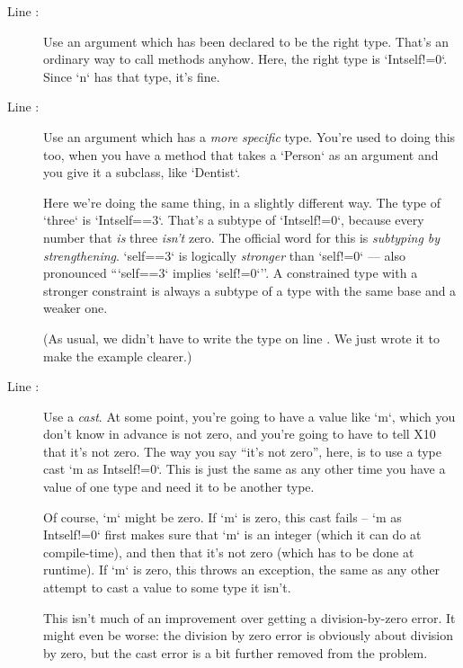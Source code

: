 \begin{description}
\item [Line :] Use an argument which has been
      declared to be the right type.  That's an ordinary way to call methods
      anyhow.  Here, the right type is \xcd`Int{self!=0}`.  Since \xcd`n` has
      that type, it's fine.
\item [Line :] Use an argument which has a
      {\em more specific} type.  You're used to doing this too, when you have
      a method that takes a \xcd`Person` as an argument and you give it a
      subclass, like \xcd`Dentist`.  

      Here we're doing the same thing, in a
      slightly different way. 
      The type of \xcd`three` is \xcd`Int{self==3}`.  That's a subtype of 
      \xcd`Int{self!=0}`, because every number that {\em is} three {\em isn't}
      zero.    The official word for this is {\em subtyping by strengthening}.  
      \xcd`self==3` is logically {\em stronger} than \xcd`self!=0` --- also
      pronounced ``\xcd`self==3` implies \xcd`self!=0`''.  
      A constrained type with a stronger constraint is always a subtype of a
      type with the same base and a weaker one.  

      (As usual, we didn't have to write the type on line
      .  We  just wrote it to make the
      example clearer.)
      
\item [Line :] 
      Use a {\em cast}.  
      At some point, you're going to
      have a value like \xcd`m`, which you don't know in advance is not zero,
      and you're going to have to tell X10 that it's not zero.  The way you
      say ``it's not zero'', here, is to use a type cast  
      \xcd`m as Int{self!=0}`.  This is just the same as any other time you
      have a value of one type and need it to be another type.

      Of course, \xcd`m` might be zero.  If \xcd`m` is zero, this cast fails
      -- \xcd`m as Int{self!=0}` first makes sure that \xcd`m` is an integer
      (which it can do at compile-time), and then that it's not zero (which
      has to be done at runtime).    If \xcd`m` is zero, this throws an
      exception, the same as any other attempt to cast a value to some type it
      isn't.   

      This isn't much of an improvement over getting a division-by-zero error.
      It might even be worse: the division by zero error is obviously about
      division by zero, but the cast error is a bit further removed from the
      problem.  


\end{description}
